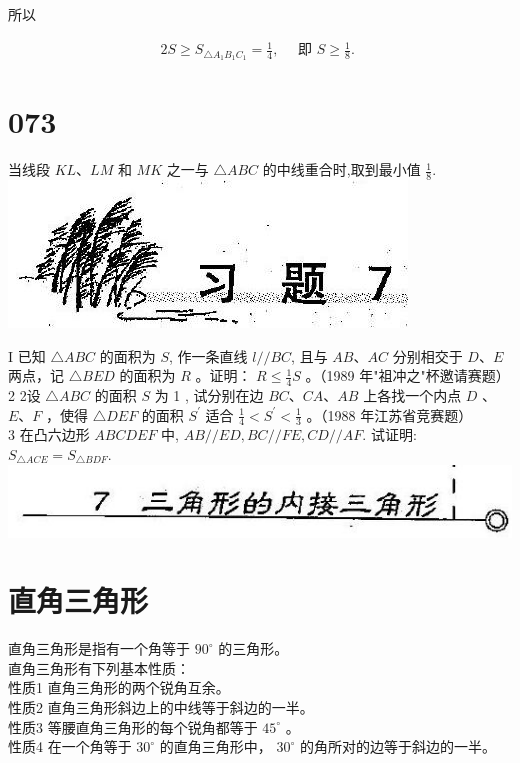 \documentclass[10pt]{article}
\begin{document}
所以

\begin{align*}
2 S \geqslant S_{\triangle A_{1} B_{1} C_{1}}=\frac{1}{4}, \quad \text { 即 } S \geqslant \frac{1}{8} \text {. }
\end{align*}

\section*{073}
当线段 $K L 、 L M$ 和 $M K$ 之一与 $\triangle A B C$ 的中线重合时,取到最小值 $\frac{1}{8}$.\\
\includegraphics[max width=\textwidth, center]{2024_10_30_2c8f45efd4a519b08e1ag-079(2)}

I 已知 $\triangle A B C$ 的面积为 $S$, 作一条直线 $l / / B C$, 且与 $A B 、 A C$ 分别相交于 $D 、 E$ 两点，记 $\triangle B E D$ 的面积为 $R$ 。证明： $R \leqslant \frac{1}{4} S$ 。（1989 年"祖冲之"杯邀请赛题）\\
2 2设 $\triangle A B C$ 的面积 $S$ 为 1 , 试分别在边 $B C 、 C A 、 A B$ 上各找一个内点 $D$ 、 $E 、 F$ ，使得 $\triangle D E F$ 的面积 $S^{\prime}$ 适合 $\frac{1}{4}<S^{\prime}<\frac{1}{3}$ 。（1988 年江苏省竞赛题）\\
3 在凸六边形 $A B C D E F$ 中, $A B / / E D, B C / / F E, C D / / A F$. 试证明: $S_{\triangle A C E}=S_{\triangle B D F}$.\\
\includegraphics[max width=\textwidth, center]{2024_10_30_2c8f45efd4a519b08e1ag-079}

\section*{直角三角形}
直角三角形是指有一个角等于 $90^{\circ}$ 的三角形。\\
直角三角形有下列基本性质：\\
性质1 直角三角形的两个锐角互余。\\
性质2 直角三角形斜边上的中线等于斜边的一半。\\
性质3 等腰直角三角形的每个锐角都等于 $45^{\circ}$ 。\\
性质4 在一个角等于 $30^{\circ}$ 的直角三角形中， $30^{\circ}$ 的角所对的边等于斜边的一半。
\end{document}
